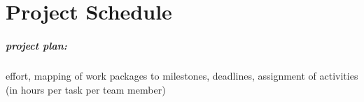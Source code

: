 \chapter{Project Schedule}
\label{chp:schedule}


\begin{shaded}
\paragraph{project plan:} effort, mapping of work packages to milestones, deadlines, assignment of activities (in hours per task per team member)
\end{shaded}

\lipsum[30]
